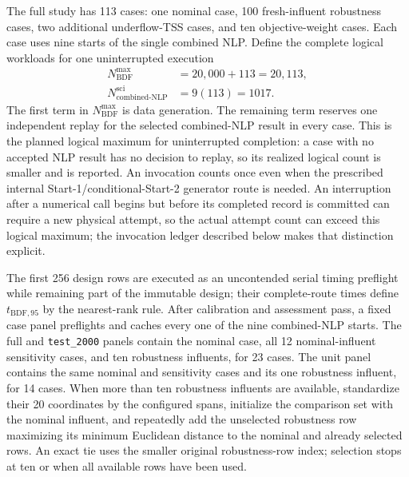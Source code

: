 \documentclass[a4paper,fleqn]{cas-sc}
\begin{document}
The full study has 113 cases: one nominal case, 100 fresh-influent robustness cases, two additional underflow-TSS cases, and ten objective-weight cases. Each case uses nine starts of the single combined NLP. Define the complete logical workloads for one uninterrupted execution
\begin{equation}
\begin{aligned}
N_{\mathrm{BDF}}^{\max}&=20{,}000+113=20{,}113,\\
N_{\mathrm{combined\text{-}NLP}}^{\mathrm{sci}}&=9(113)=1017.
\end{aligned}
\end{equation}
The first term in $N_{\mathrm{BDF}}^{\max}$ is data generation. The remaining term reserves one independent replay for the selected combined-NLP result in every case. This is the planned logical maximum for uninterrupted completion: a case with no accepted NLP result has no decision to replay, so its realized logical count is smaller and is reported. An invocation counts once even when the prescribed internal Start-1/conditional-Start-2 generator route is needed. An interruption after a numerical call begins but before its completed record is committed can require a new physical attempt, so the actual attempt count can exceed this logical maximum; the invocation ledger described below makes that distinction explicit.

The first 256 design rows are executed as an uncontended serial timing preflight while remaining part of the immutable design; their complete-route times define $t_{\mathrm{BDF},95}$ by the nearest-rank rule. After calibration and assessment pass, a fixed case panel preflights and caches every one of the nine combined-NLP starts. The full and \texttt{test\_2000} panels contain the nominal case, all 12 nominal-influent sensitivity cases, and ten robustness influents, for 23 cases. The unit panel contains the same nominal and sensitivity cases and its one robustness influent, for 14 cases. When more than ten robustness influents are available, standardize their 20 coordinates by the configured spans, initialize the comparison set with the nominal influent, and repeatedly add the unselected robustness row maximizing its minimum Euclidean distance to the nominal and already selected rows. An exact tie uses the smaller original robustness-row index; selection stops at ten or when all available rows have been used.
\end{document}
